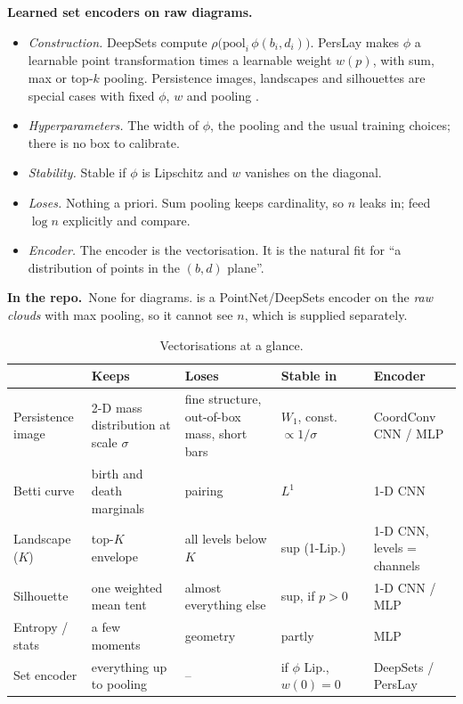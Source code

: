 \documentclass[10pt,a4paper]{article}
\newcommand{\code}[1]{\texttt{\detokenize{#1}}}
\newcommand{\repo}{\par\textbf{In the repo.}\ }
\begin{document}
\textbf{Learned set encoders on raw diagrams.}
\begin{itemize}
  \item \emph{Construction.} DeepSets \citep{Zaheer2017} compute $\rho\big(\mathrm{pool}_i\,\phi(b_i,d_i)\big)$. PersLay \citep{Carriere2020} makes $\phi$ a learnable point transformation times a learnable weight $w(p)$, with sum, max or top-$k$ pooling. Persistence images, landscapes and silhouettes are special cases with fixed $\phi$, $w$ and pooling \citep[see also][]{Hofer2017}.
  \item \emph{Hyperparameters.} The width of $\phi$, the pooling and the usual training choices; there is no box to calibrate.
  \item \emph{Stability.} Stable if $\phi$ is Lipschitz and $w$ vanishes on the diagonal.
  \item \emph{Loses.} Nothing a priori. Sum pooling keeps cardinality, so $n$ leaks in; feed $\log n$ explicitly and compare.
  \item \emph{Encoder.} The encoder is the vectorisation. It is the natural fit for ``a distribution of points in the $(b,d)$ plane''.
\end{itemize}
\repo None for diagrams. \code{encoders/point_cloud.py} is a PointNet/DeepSets encoder on the \emph{raw clouds} with max pooling, so it cannot see $n$, which is supplied separately.

\begin{table}[ht]
\centering\small
\begin{tabularx}{\linewidth}{@{}l X X l l@{}}
\toprule
 & Keeps & Loses & Stable in & Encoder\\
\midrule
Persistence image & 2-D mass distribution at scale $\sigma$ & fine structure, out-of-box mass, short bars & $W_1$, const.\ $\propto1/\sigma$ & CoordConv CNN / MLP\\
Betti curve & birth and death marginals & pairing & $L^1$ & 1-D CNN\\
Landscape ($K$) & top-$K$ envelope & all levels below $K$ & sup (1-Lip.) & 1-D CNN, levels = channels\\
Silhouette & one weighted mean tent & almost everything else & sup, if $p>0$ & 1-D CNN / MLP\\
Entropy / stats & a few moments & geometry & partly & MLP\\
Set encoder & everything up to pooling & -- & if $\phi$ Lip., $w(0)=0$ & DeepSets / PersLay\\
\bottomrule
\end{tabularx}
\caption{Vectorisations at a glance.}
\label{tab:vec}
\end{table}
\end{document}
